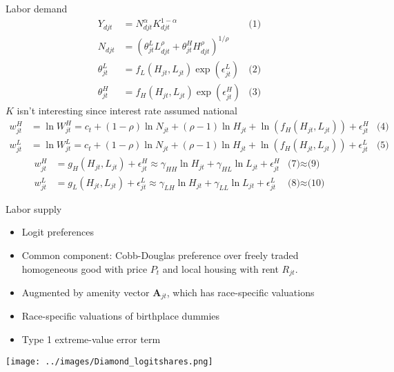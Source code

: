 \documentclass[11pt,notes=hide,aspectratio=169]{beamer}
\begin{document}
\begin{frame}{Labor demand}
\vspace{-8mm}
\begin{align*}
Y_{djt} &= N^{\alpha}_{djt} K^{1-\alpha}_{djt}
&\text{(1)} \\
N_{djt} &= \left(\theta^{L}_{jt} L^{\rho}_{djt} + \theta^{H}_{jt} H^{\rho}_{djt}\right)^{1/{\rho}} \\
\theta^{L}_{jt} &= f_L \left(H_{jt}, L_{jt}\right) \exp(\epsilon_{jt}^{L})
&\text{(2)} \\
\theta^{H}_{jt} &= f_H \left(H_{jt}, L_{jt}\right) \exp(\epsilon_{jt}^{H})
&\text{(3)}
\end{align*}
$K$ isn't interesting since interest rate assumed national
\begin{align*}
w_{jt}^{H} &= \ln W_{jt}^{H} = c_{t} + (1-\rho) \ln N_{jt} + (\rho-1) \ln H_{jt} + \ln \left(f_H(H_{jt},L_{jt})\right) + \epsilon_{jt}^{H}
&\text{(4)} \\
w_{jt}^{L} &= \ln W_{jt}^{L} = c_{t} + (1-\rho) \ln N_{jt} + (\rho-1) \ln H_{jt} + \ln \left(f_H(H_{jt},L_{jt})\right) + \epsilon_{jt}^{L}
&\text{(5)}
\end{align*}
\begin{align*}
w_{jt}^{H} &= g_{H} \left(H_{jt},L_{jt}\right) + \epsilon_{jt}^{H}
\approx \gamma_{HH} \ln H_{jt} + \gamma_{HL} \ln L_{jt} + \epsilon_{jt}^{H}
&\text{(7)}\approx\text{(9)} \\
w_{jt}^{L} &= g_{L} \left(H_{jt},L_{jt}\right) + \epsilon_{jt}^{L}
\approx \gamma_{LH} \ln H_{jt} + \gamma_{LL} \ln L_{jt} + \epsilon_{jt}^{L}
&\text{(8)} \approx \text{(10)}
\end{align*}
\end{frame}
\begin{frame}{Labor supply}
\begin{itemize}
	\item Logit preferences
	\item Common component: Cobb-Douglas preference over freely traded homogeneous good with price $P_t$ and local housing with rent $R_{jt}$.
	\item Augmented by amenity vector $\mathbf{A}_{jt}$, which has race-specific valuations
	\item Race-specific valuations of birthplace dummies
	\item Type 1 extreme-value error term
\end{itemize}
\begin{center}
\texttt{[image: ../images/Diamond\_logitshares.png]}
\end{center}
\end{frame}
\end{document}
